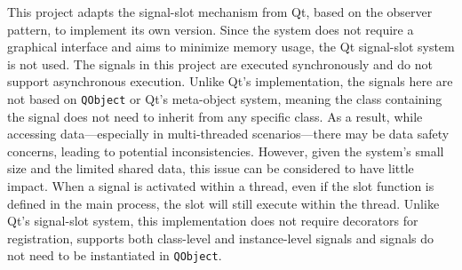 \documentclass[
english,
ruledheaders=section,%
class=report,%
thesis={type=Report},%
accentcolor=9c,%
custommargins=true,%
marginpar=false,%
parskip=half-,%
fontsize=11pt,%
logofile={img/tuda_logo.pdf}, %
]{tudapub}
\begin{document}
    This project adapts the signal-slot mechanism from Qt, based on the observer pattern, to implement its own version. Since the system does not require a graphical interface and aims to minimize memory usage, the Qt signal-slot system is not used. The signals in this project are executed synchronously and do not support asynchronous execution. Unlike Qt's implementation, the signals here are not based on \texttt{QObject} or Qt's meta-object system, meaning the class containing the signal does not need to inherit from any specific class. As a result, while accessing data—especially in multi-threaded scenarios—there may be data safety concerns, leading to potential inconsistencies. However, given the system's small size and the limited shared data, this issue can be considered to have little impact. When a signal is activated within a thread, even if the slot function is defined in the main process, the slot will still execute within the thread. Unlike Qt’s signal-slot system, this implementation does not require decorators for registration, supports both class-level and instance-level signals and signals do not need to be instantiated in \texttt{QObject}.

\end{document}
